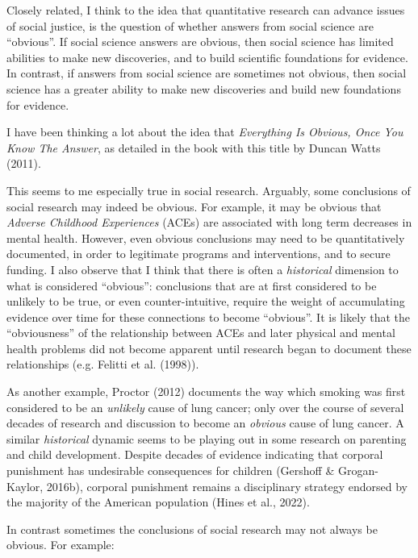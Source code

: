 \documentclass[
  letterpaper,
  DIV=11,
  numbers=noendperiod]{scrreprt}
\begin{document}
Closely related, I think to the idea that quantitative research can
advance issues of social justice, is the question of whether answers
from social science are ``obvious''. If social science answers are
obvious, then social science has limited abilities to make new
discoveries, and to build scientific foundations for evidence. In
contrast, if answers from social science are sometimes not obvious, then
social science has a greater ability to make new discoveries and build
new foundations for evidence.

I have been thinking a lot about the idea that \emph{Everything Is
Obvious, Once You Know The Answer}, as detailed in the book with this
title by Duncan Watts (2011). 

This seems to me especially true in social research. Arguably, some
conclusions of social research may indeed be obvious. For example, it
may be obvious that \emph{Adverse Childhood Experiences} (ACEs) are
associated with long term decreases in mental health. However, even
obvious conclusions may need to be quantitatively documented, in order
to legitimate programs and interventions, and to secure funding. I also
observe that I think that there is often a \emph{historical} dimension
to what is considered ``obvious'': conclusions that are at first
considered to be unlikely to be true, or even counter-intuitive, require
the weight of accumulating evidence over time for these connections to
become ``obvious''. It is likely that the ``obviousness'' of the
relationship between ACEs and later physical and mental health problems
did not become apparent until research began to document these
relationships (e.g. Felitti et al. (1998)).

As another example, Proctor (2012) documents the way which smoking was
first considered to be an \emph{unlikely} cause of lung cancer; only
over the course of several decades of research and discussion to become
an \emph{obvious} cause of lung cancer. A similar \emph{historical}
dynamic seems to be playing out in some research on parenting and child
development. Despite decades of evidence indicating that corporal
punishment has undesirable consequences for children (Gershoff \&
Grogan-Kaylor, 2016b), corporal punishment remains a disciplinary
strategy endorsed by the majority of the American population (Hines et
al., 2022).

In contrast sometimes the conclusions of social research may not always
be obvious. For example:
\end{document}
